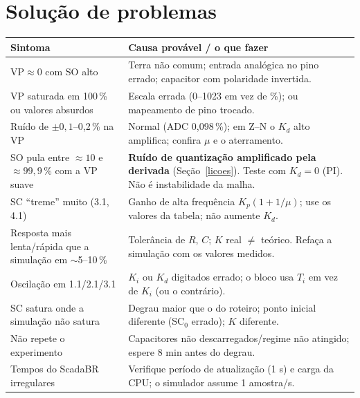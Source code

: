 \documentclass[11pt,a4paper]{article}
\begin{document}
\section{Solução de problemas}
\begin{center}\small
\begin{tabular}{p{4.6cm}p{10.4cm}}\toprule Sintoma & Causa provável / o que fazer\\\midrule
VP$\approx0$ com SO alto & Terra não comum; entrada analógica no pino errado; capacitor com polaridade invertida.\\
VP saturada em 100\,\% ou valores absurdos & Escala errada (0--1023 em vez de \%); ou mapeamento de pino trocado.\\
Ruído de $\pm0{,}1$--0,2\,\% na VP & Normal (ADC 0,098\,\%); em Z--N o $K_d$ alto amplifica; confira $\mu$ e o aterramento.\\
SO pula entre $\approx10$ e $\approx99{,}9\,\%$ com a VP suave & \textbf{Ruído de quantização amplificado pela derivada} (Seção~\ref{licoes}). Teste com $K_d=0$ (PI). Não é instabilidade da malha.\\
SC ``treme'' muito (3.1, 4.1) & Ganho de alta frequência $K_p(1+1/\mu)$; use os valores da tabela; não aumente $K_d$.\\
Resposta mais lenta/rápida que a simulação em $\sim$5--10\,\% & Tolerância de $R$, $C$; $K$ real $\ne$ teórico. Refaça a simulação com os valores medidos.\\
Oscilação em 1.1/2.1/3.1 & $K_i$ ou $K_d$ digitados errado; o bloco usa $T_i$ em vez de $K_i$ (ou o contrário).\\
SC satura onde a simulação não satura & Degrau maior que o do roteiro; ponto inicial diferente (SC$_0$ errado); $K$ diferente.\\
Não repete o experimento & Capacitores não descarregados/regime não atingido; espere 8 min antes do degrau.\\
Tempos do ScadaBR irregulares & Verifique período de atualização (1 s) e carga da CPU; o simulador assume 1 amostra/s.\\\bottomrule\end{tabular}\end{center}
\end{document}

